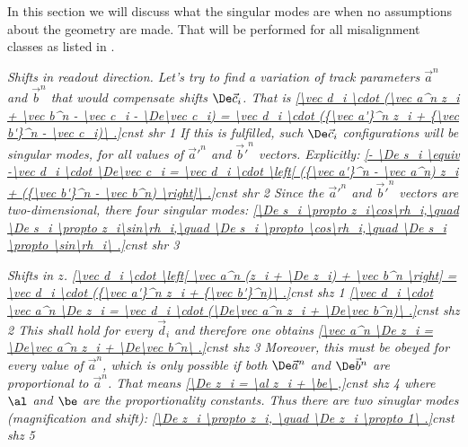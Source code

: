 In this section we will discuss what the singular modes are when no assumptions about the geometry are made. That will be performed for all misalignment classes as listed in .

\em{Shifts in readout direction}. Let's try to find a variation of track parameters $\vec a^n$ and $\vec b^n$ that would compensate shifts $\De\vec c_i$. That is
\eqref{\vec d_i \cdot (\vec a^n z_i + \vec b^n - \vec c_i - \De\vec c_i) = \vec d_i \cdot ({\vec a'}^n z_i + {\vec b'}^n - \vec c_i)\ .}{cnst shr 1}
If this is fulfilled, such $\De\vec c_i$ configurations will be singular modes, for all values of ${\vec a'}^n$ and ${\vec b'}^n$ vectors. Explicitly:
\eqref{- \De s_i \equiv -\vec d_i \cdot \De\vec c_i = \vec d_i \cdot \left[ ({\vec a'}^n - \vec a^n) z_i + ({\vec b'}^n - \vec b^n) \right]\ .}{cnst shr 2}
Since the ${\vec a'}^n$ and ${\vec b'}^n$ vectors are two-dimensional, there four singular modes:
\eqref{\De s_i \propto z_i\cos\rh_i,\quad \De s_i \propto z_i\sin\rh_i,\quad \De s_i \propto \cos\rh_i,\quad \De s_i \propto \sin\rh_i\ .}{cnst shr 3}


\em{Shifts in $z$}. 
\eqref{\vec d_i \cdot \left[ \vec a^n (z_i + \De z_i) + \vec b^n \right] = \vec d_i \cdot ({\vec a'}^n z_i + {\vec b'}^n)\ .}{cnst shz 1}
\eqref{\vec d_i \cdot \vec a^n \De z_i = \vec d_i \cdot (\De\vec a^n z_i + \De\vec b^n)\ .}{cnst shz 2}
This shall hold for every $\vec d_i$ and therefore one obtains
\eqref{\vec a^n \De z_i = \De\vec a^n z_i + \De\vec b^n\ .}{cnst shz 3}
Moreover, this must be obeyed for every value of $\vec a^n$, which is only possible if both $\De\vec a^n$ and $\De\vec b^n$ are proportional to $\vec a^n$. That means
\eqref{\De z_i = \al z_i + \be\ ,}{cnst shz 4}
where $\al$ and $\be$ are the proportionality constants. Thus there are two sinuglar modes (magnification and shift):
\eqref{\De z_i \propto z_i, \quad \De z_i \propto 1\ .}{cnst shz 5}

